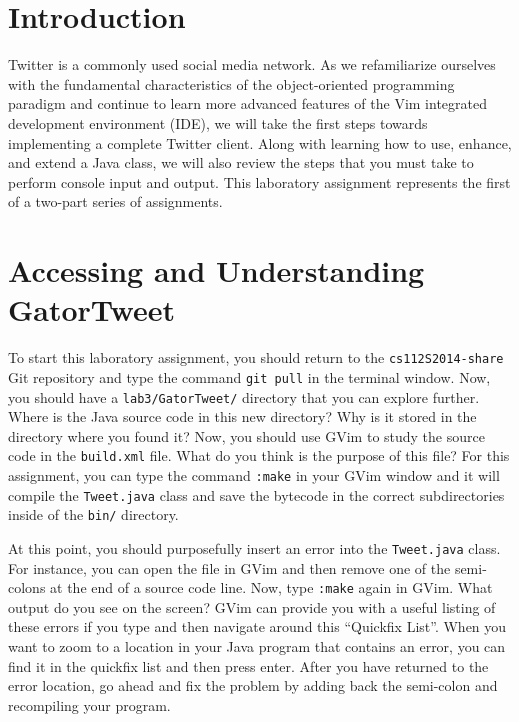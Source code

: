 


\usepackage[compact]{titlesec}



\section*{Introduction}

Twitter is a commonly used social media network.  As we refamiliarize ourselves with the fundamental characteristics of the
object-oriented programming paradigm and continue to learn more advanced features of the Vim integrated development environment
(IDE), we will take the first steps towards implementing a complete Twitter client. Along with learning how to use, enhance, and
extend a Java class, we will also review the steps that you must take to perform console input and output. This laboratory
assignment represents the first of a two-part series of assignments. 

\section*{Accessing and Understanding GatorTweet}

To start this laboratory assignment, you should return to the {\tt cs112S2014-share} Git repository and type the command {\tt git
pull} in the terminal window.  Now, you should have a {\tt lab3/GatorTweet/} directory that you can explore further.  Where is
the Java source code in this new directory? Why is it stored in the directory where you found it? Now, you should use GVim to
study the source code in the {\tt build.xml} file.  What do you think is the purpose of this file? For this assignment, you can
type the command {\tt :make} in your GVim window and it will compile the {\tt Tweet.java} class and save the bytecode in the
correct subdirectories inside of the {\tt bin/} directory. 

At this point, you should purposefully insert an error into the {\tt Tweet.java} class.  For instance, you can open the file in
GVim and then remove one of the semi-colons at the end of a source code line. Now, type {\tt :make} again in GVim.  What output do
you see on the screen? GVim can provide you with a useful listing of these errors if you type {\tt <,q>} and then navigate around this
``Quickfix List''. When you want to zoom to a location in your Java program that contains an error, you can find it in the
quickfix list and then press enter.  After you have returned to the error location, go ahead and fix the problem by adding back
the semi-colon and recompiling your program. 

